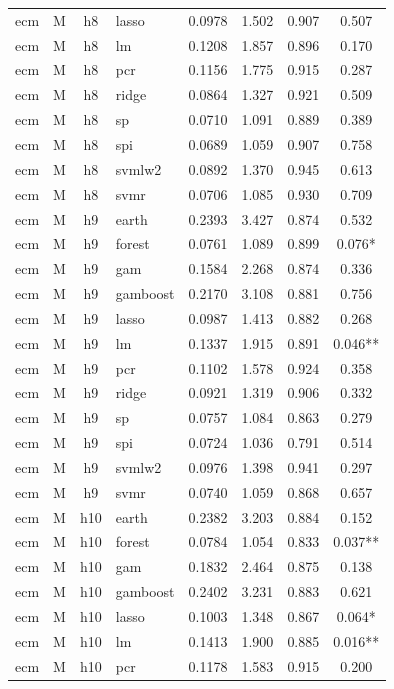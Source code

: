 \begin{ThreePartTable}
\begin{longtable}[t]{llclcccc}
ecm & M & h8 & lasso & 0.0978 & 1.502 & 0.907 & 0.507\\
ecm & M & h8 & lm & 0.1208 & 1.857 & 0.896 & 0.170\\
ecm & M & h8 & pcr & 0.1156 & 1.775 & 0.915 & 0.287\\
ecm & M & h8 & ridge & 0.0864 & 1.327 & 0.921 & 0.509\\
ecm & M & h8 & sp & 0.0710 & 1.091 & 0.889 & 0.389\\
ecm & M & h8 & spi & 0.0689 & 1.059 & 0.907 & 0.758\\
ecm & M & h8 & svmlw2 & 0.0892 & 1.370 & 0.945 & 0.613\\
ecm & M & h8 & svmr & 0.0706 & 1.085 & 0.930 & 0.709\\
\addlinespace
ecm & M & h9 & earth & 0.2393 & 3.427 & 0.874 & 0.532\\
ecm & M & h9 & forest & 0.0761 & 1.089 & 0.899 & 0.076*\\
ecm & M & h9 & gam & 0.1584 & 2.268 & 0.874 & 0.336\\
ecm & M & h9 & gamboost & 0.2170 & 3.108 & 0.881 & 0.756\\
ecm & M & h9 & lasso & 0.0987 & 1.413 & 0.882 & 0.268\\
ecm & M & h9 & lm & 0.1337 & 1.915 & 0.891 & 0.046**\\
ecm & M & h9 & pcr & 0.1102 & 1.578 & 0.924 & 0.358\\
ecm & M & h9 & ridge & 0.0921 & 1.319 & 0.906 & 0.332\\
ecm & M & h9 & sp & 0.0757 & 1.084 & 0.863 & 0.279\\
ecm & M & h9 & spi & 0.0724 & 1.036 & 0.791 & 0.514\\
ecm & M & h9 & svmlw2 & 0.0976 & 1.398 & 0.941 & 0.297\\
ecm & M & h9 & svmr & 0.0740 & 1.059 & 0.868 & 0.657\\
\addlinespace
ecm & M & h10 & earth & 0.2382 & 3.203 & 0.884 & 0.152\\
ecm & M & h10 & forest & 0.0784 & 1.054 & 0.833 & 0.037**\\
ecm & M & h10 & gam & 0.1832 & 2.464 & 0.875 & 0.138\\
ecm & M & h10 & gamboost & 0.2402 & 3.231 & 0.883 & 0.621\\
ecm & M & h10 & lasso & 0.1003 & 1.348 & 0.867 & 0.064*\\
ecm & M & h10 & lm & 0.1413 & 1.900 & 0.885 & 0.016**\\
ecm & M & h10 & pcr & 0.1178 & 1.583 & 0.915 & 0.200\\

\end{longtable}
\end{ThreePartTable}
